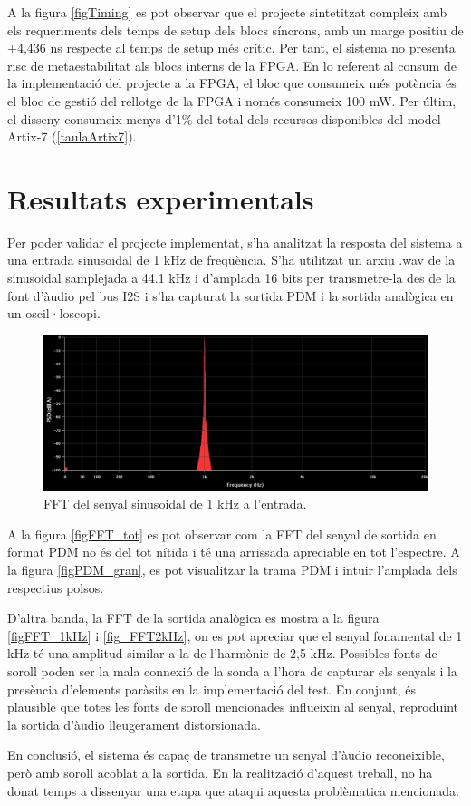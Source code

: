 \par A la figura \ref{figTiming} es pot observar que el projecte sintetitzat compleix amb els requeriments dels temps de setup dels blocs síncrons, amb un marge positiu de +4,436 ns respecte al temps de setup més crític. Per tant, el sistema no presenta risc de metaestabilitat als blocs interns de la FPGA. En lo referent al consum de la implementació del projecte a la FPGA, el bloc que consumeix més potència és el bloc de gestió del rellotge de la FPGA i només consumeix 100 mW. Per últim, el disseny consumeix menys d'1\% del total dels recursos disponibles del model Artix-7 (\ref{taulaArtix7}).

\section{Resultats experimentals}
\par Per poder validar el projecte implementat, s'ha analitzat la resposta del sistema a una entrada sinusoidal de 1 kHz de freqüència. S'ha utilitzat un arxiu .wav de la sinusoidal samplejada a 44.1 kHz i d'amplada 16 bits \cite{Sin1kHZ} per transmetre-la des de la font d'àudio pel bus I2S i s'ha capturat la sortida PDM i la sortida analògica en un oscil·loscopi.
\begin{figure}[H]
    \centering
    \includegraphics[width=0.7\linewidth]{Images/FFT_in.png}
    \caption{FFT del senyal sinusoidal de 1 kHz a l'entrada.\cite{FFTSin1kHz}}
    \label{figFFTsine}
\end{figure}
\par A la figura \ref{figFFT_tot} es pot observar com la FFT del senyal de sortida en format PDM no és del tot nítida i té una arrissada apreciable en tot l'espectre. A la figura \ref{figPDM_gran}, es pot visualitzar la trama PDM i intuir l'amplada dels respectius polsos.  
\par D'altra banda, la FFT de la sortida analògica es mostra a la figura \ref{figFFT_1kHz} i \ref{fig_FFT2kHz}, on es pot apreciar que el senyal fonamental de 1 kHz té una amplitud similar a la de l'harmònic de 2,5 kHz. Possibles fonts de soroll poden ser la mala connexió de la sonda a l'hora de capturar els senyals i la presència d'elements paràsits en la implementació del test. En conjunt, és plausible que totes les fonts de soroll mencionades influeixin al senyal, reproduint la sortida d'àudio lleugerament distorsionada. 
\par En conclusió, el sistema és capaç de transmetre un senyal d'àudio reconeixible, però amb soroll acoblat a la sortida. En la realització d'aquest treball, no ha donat temps a dissenyar una etapa que ataqui aquesta problèmatica mencionada. 


